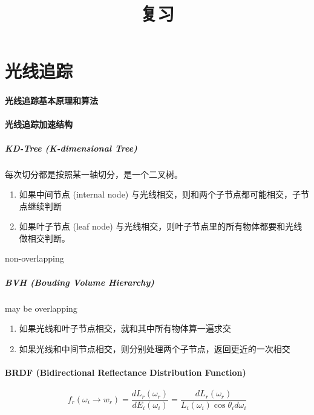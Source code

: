 \documentclass[]{ctexart}
\begin{document}
    \title{复习}
    \maketitle
        \section{光线追踪}
\paragraph{光线追踪基本原理和算法}



\paragraph{光线追踪加速结构}

\subparagraph{KD-Tree (K-dimensional Tree)}

每次切分都是按照某一轴切分，是一个二叉树。

\begin{enumerate}
    \item 如果中间节点 (internal node) 与光线相交，则和两个子节点都可能相交，子节点继续判断
    \item 如果叶子节点 (leaf node) 与光线相交，则叶子节点里的所有物体都要和光线做相交判断。
\end{enumerate}

non-overlapping

\subparagraph{BVH (Bouding Volume Hierarchy)} 

may be overlapping

\begin{enumerate}
    \item 如果光线和叶子节点相交，就和其中所有物体算一遍求交
    \item 如果光线和中间节点相交，则分别处理两个子节点，返回更近的一次相交
\end{enumerate}

\paragraph{BRDF (Bidirectional Reflectance Distribution Function)}

\begin{equation}    
    f_r(\omega_i\rightarrow w_r)=\frac{d L_r(\omega_r)}{d E_i(\omega_i)}=\frac{d L_r(\omega_r)}{L_i(\omega_i)\cos\theta_i d\omega_i}
\end{equation}
\end{document}
